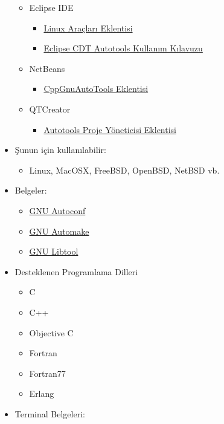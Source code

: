 \documentclass[
]{book}
\providecommand{\tightlist}{%
  \setlength{\itemsep}{0pt}\setlength{\parskip}{0pt}}
\begin{document}
\begin{itemize}
  \begin{itemize}
  \tightlist
  \item
    Eclipse IDE

    \begin{itemize}
    \tightlist
    \item
      \href{https://www.eclipse.org/linuxtools/}{Linux Araçları Eklentisi}
    \item
      \href{https://wiki.eclipse.org/CDT/Autotools/User_Guide}{Eclipse CDT Autotools Kullanım Kılavuzu}
    \end{itemize}
  \item
    NetBeans

    \begin{itemize}
    \tightlist
    \item
      \href{http://plugins.netbeans.org/plugin/51647/cppgnuautotools}{CppGnuAutoTools Eklentisi}
    \end{itemize}
  \item
    QTCreator

    \begin{itemize}
    \tightlist
    \item
      \href{https://doc.qt.io/qtcreator/creator-projects-autotools.html}{Autotools Proje Yöneticisi Eklentisi}
    \end{itemize}
  \end{itemize}
\item
  Şunun için kullanılabilir:

  \begin{itemize}
  \tightlist
  \item
    Linux, MacOSX, FreeBSD, OpenBSD, NetBSD vb.
  \end{itemize}
\item
  Belgeler:

  \begin{itemize}
  \tightlist
  \item
    \href{https://www.gnu.org/software/autoconf/}{GNU Autoconf}
  \item
    \href{https://www.gnu.org/software/automake/automake.html}{GNU Automake}
  \item
    \href{https://www.gnu.org/software/libtool/libtool.html}{GNU Libtool}
  \end{itemize}
\item
  Desteklenen Programlama Dilleri

  \begin{itemize}
  \tightlist
  \item
    C
  \item
    C++
  \item
    Objective C
  \item
    Fortran
  \item
    Fortran77
  \item
    Erlang
  \end{itemize}
\item
  Terminal Belgeleri:


\end{itemize}
\end{document}
